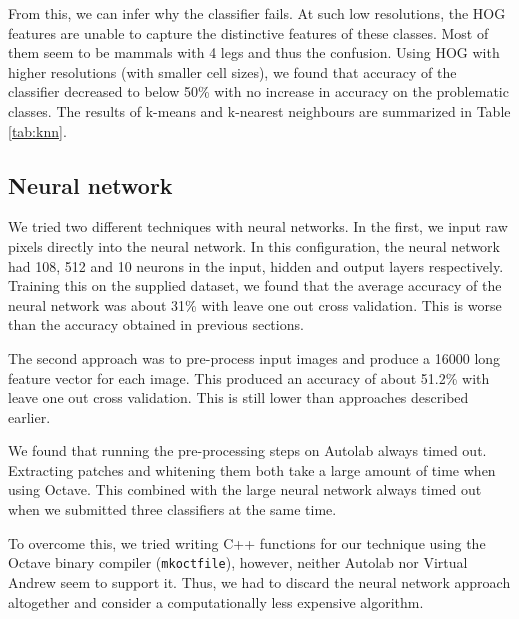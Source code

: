 \documentclass{article} %
\begin{document}
        From this, we can infer why the classifier fails. At such low resolutions, the HOG features are unable to capture the distinctive features of these classes. Most of them seem to be mammals with 4 legs and thus the confusion. Using HOG with higher resolutions (with smaller cell sizes), we found that accuracy of the classifier decreased to below 50\% with no increase in accuracy on the problematic classes. The results of k-means and k-nearest neighbours are summarized in Table \ref{tab:knn}.
        
    \subsection{Neural network} %
    \label{sub:Results}
        We tried two different techniques with neural networks. In the first, we input raw pixels directly into the neural network. In this configuration, the neural network had 108, 512 and 10 neurons in the input, hidden and output layers respectively. Training this on the supplied dataset, we found that the average accuracy of the neural network was about 31\% with leave one out cross validation. This is worse than the accuracy obtained in previous sections.

        The second approach was to pre-process input images and produce a 16000 long feature vector for each image. This produced an accuracy of about 51.2\% with leave one out cross validation. This is still lower than approaches described earlier.

        We found that running the pre-processing steps on Autolab always timed out. Extracting patches and whitening them both take a large amount of time when using Octave. This combined with the large neural network always timed out when we submitted three classifiers at the same time.

        To overcome this, we tried writing C++ functions for our technique using the Octave binary compiler (\texttt{mkoctfile}), however, neither Autolab nor Virtual Andrew seem to support it. Thus, we had to discard the neural network approach altogether and consider a computationally less expensive algorithm.
\end{document}

